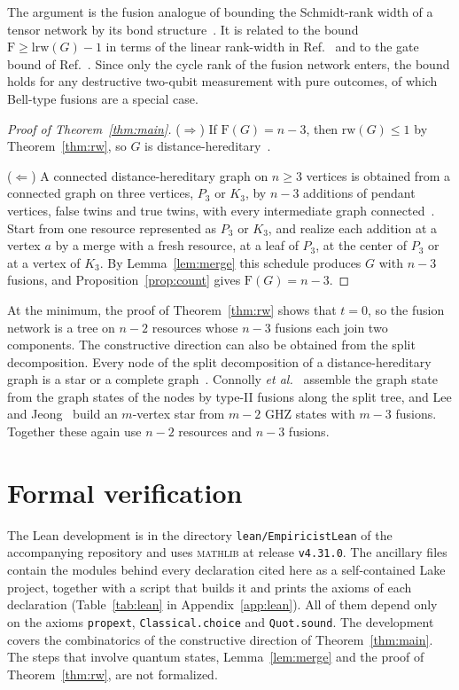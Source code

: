 \documentclass[aps,pra,onecolumn,superscriptaddress,nofootinbib,longbibliography]{revtex4-2}
\theoremstyle{plain}
\theoremstyle{remark}
\newcommand{\F}{\mathrm{F}}
\newcommand{\rw}{\mathrm{rw}}
\newcommand{\codeus}{\textunderscore\allowbreak}
\newcommand{\code}[1]{\texttt{\let\_\codeus #1}}
\begin{document}
The argument is the fusion analogue of bounding the Schmidt-rank width of a tensor network by its bond
structure~\cite{VandenNest2006universal,VandenNest2007classical}. It is related to the bound
$\F\ge\mathrm{lrw}(G)-1$ in terms of the linear rank-width in Ref.~\cite{Lobl2025generating} and to the gate
bound of Ref.~\cite{Kumabe2026complexity}. Since only the cycle rank of the fusion network enters, the bound
holds for any destructive two-qubit measurement with pure outcomes, of which Bell-type fusions are a special
case.

\begin{proof}[Proof of Theorem~\ref{thm:main}]
($\Rightarrow$) If $\F(G)=n-3$, then $\rw(G)\le 1$ by Theorem~\ref{thm:rw}, so $G$ is
distance-hereditary~\cite{Oum2005rank}.

($\Leftarrow$) A connected distance-hereditary graph on $n\ge 3$ vertices is obtained from a connected
graph on three vertices, $P_3$ or $K_3$, by $n-3$ additions of pendant vertices, false twins and true twins,
with every intermediate graph connected~\cite{Bandelt1986distance}. Start from one resource represented as
$P_3$ or $K_3$, and realize each addition at a vertex $a$ by a merge with a fresh resource, at a leaf of
$P_3$, at the center of $P_3$ or at a vertex of $K_3$. By Lemma~\ref{lem:merge} this schedule produces $G$
with $n-3$ fusions, and Proposition~\ref{prop:count} gives $\F(G)=n-3$.
\end{proof}

At the minimum, the proof of Theorem~\ref{thm:rw} shows that $t=0$, so the fusion network is a tree on
$n-2$ resources whose $n-3$ fusions each join two components. The constructive direction can also be
obtained from the split decomposition. Every node of the split decomposition of a distance-hereditary graph
is a star or a complete graph~\cite{Bouchet1988transforming,Hammer1990completely,Gioan2012split}. Connolly
\emph{et al.}~\cite{Connolly2026efficient} assemble the graph state from the graph states of the nodes by
type-II fusions along the split tree, and Lee and Jeong~\cite{Lee2023graph} build an $m$-vertex star from
$m-2$ GHZ states with $m-3$ fusions. Together these again use $n-2$ resources and $n-3$ fusions.

\section{Formal verification}\label{sec:lean}

The Lean development is in the directory \code{lean/EmpiricistLean} of the accompanying repository and
uses \textsc{mathlib} at release \code{v4.31.0}. The ancillary files contain the modules behind every
declaration cited here as a self-contained Lake project, together with a script that builds it and prints
the axioms of each declaration (Table~\ref{tab:lean} in Appendix~\ref{app:lean}). All of them depend only
on the axioms \code{propext}, \code{Classical.choice} and \code{Quot.sound}. The development covers the
combinatorics of the constructive direction of Theorem~\ref{thm:main}. The steps that involve quantum
states, Lemma~\ref{lem:merge} and the proof of Theorem~\ref{thm:rw}, are not formalized.
\end{document}
